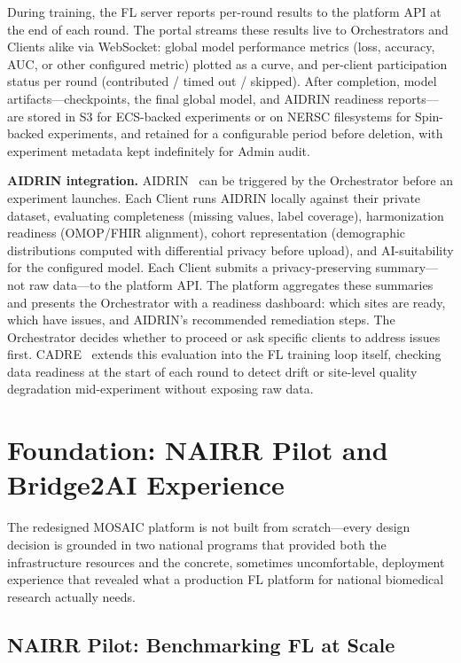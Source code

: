 \documentclass[conference]{IEEEtran}
\begin{document}
During training, the FL server reports per-round results to the
platform API at the end of each round. The portal streams these
results live to Orchestrators and Clients alike via WebSocket: global
model performance metrics (loss, accuracy, AUC, or other configured
metric) plotted as a curve, and per-client participation status per
round (contributed / timed out / skipped). After completion, model
artifacts---checkpoints, the final global model, and AIDRIN readiness
reports---are stored in S3 for ECS-backed experiments or on NERSC
filesystems for Spin-backed experiments, and retained for a
configurable period before deletion, with experiment metadata kept
indefinitely for Admin audit.

\textbf{AIDRIN integration.} AIDRIN~\cite{hiniduma2024aidrin,
hiniduma2025aidrin2} can be triggered by the Orchestrator before an
experiment launches. Each Client runs AIDRIN locally against their
private dataset, evaluating completeness (missing values, label
coverage), harmonization readiness (OMOP/FHIR alignment), cohort
representation (demographic distributions computed with differential
privacy before upload), and AI-suitability for the configured model.
Each Client submits a privacy-preserving summary---not raw data---to
the platform API. The platform aggregates these summaries and presents
the Orchestrator with a readiness dashboard: which sites are ready,
which have issues, and AIDRIN's recommended remediation steps. The
Orchestrator decides whether to proceed or ask specific clients to
address issues first. CADRE~\cite{hiniduma2025cadre} extends this
evaluation into the FL training loop itself, checking data readiness
at the start of each round to detect drift or site-level quality
degradation mid-experiment without exposing raw data.

\section{Foundation: NAIRR Pilot and Bridge2AI Experience}

The redesigned MOSAIC platform is not built from scratch---every
design decision is grounded in two national programs that provided
both the infrastructure resources and the concrete, sometimes
uncomfortable, deployment experience that revealed what a production
FL platform for national biomedical research actually needs.

\subsection{NAIRR Pilot: Benchmarking FL at Scale}
\end{document}
